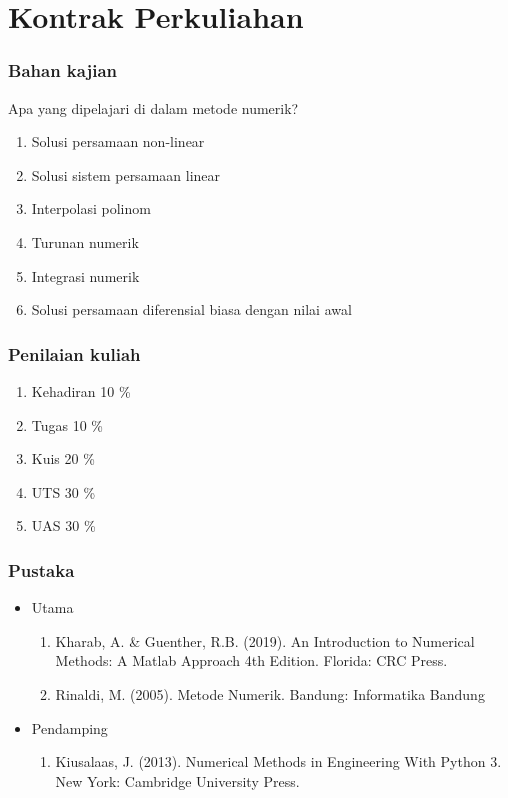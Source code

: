 \documentclass[pdflatex,compress]{beamer}
\begin{document}
\section{Kontrak Perkuliahan}

\begin{frame}
	\frametitle{Bahan kajian}
	Apa yang dipelajari di dalam metode numerik?
	\begin{enumerate}
		\item Solusi persamaan non-linear
		\item Solusi sistem persamaan linear
		\item Interpolasi polinom
		\item Turunan numerik
		\item Integrasi numerik
		\item Solusi persamaan diferensial biasa dengan nilai awal
	\end{enumerate}
\end{frame}

\begin{frame}
	\frametitle{Penilaian kuliah}
	\begin{enumerate}
		\item Kehadiran 10 \%
		\item Tugas 10 \%
		\item Kuis 20 \%
		\item UTS 30 \%
		\item UAS 30 \%
	\end{enumerate}
\end{frame}

\begin{frame}
	\frametitle{Pustaka}
	\begin{itemize}
		\item Utama
		\begin{enumerate}
			\item Kharab, A. \& Guenther, R.B. (2019). An Introduction to Numerical Methods: A Matlab Approach 4th Edition. Florida: CRC Press.
			\item Rinaldi, M. (2005). Metode Numerik. Bandung: Informatika Bandung
		\end{enumerate}
		\item Pendamping
		\begin{enumerate}
			\item Kiusalaas, J. (2013). Numerical Methods in Engineering With Python 3. New York: Cambridge University Press.
		\end{enumerate}
	\end{itemize}
\end{frame}
\end{document}
